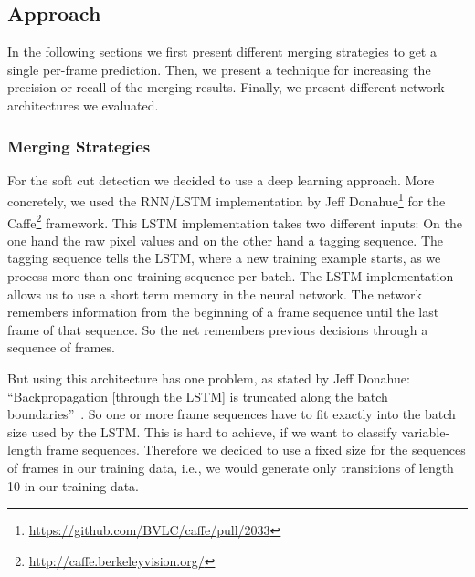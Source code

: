 \subsection{Approach}
\label{sec:soft_cut_approach}

In the following sections we first present different merging strategies to get a single per-frame prediction.
Then, we present a technique for increasing the precision or recall of the merging results.
Finally, we present different network architectures we evaluated.

\subsubsection{Merging Strategies}
For the soft cut detection we decided to use a deep learning approach.
More concretely, we used the RNN/LSTM implementation by Jeff Donahue\footnote{\url{https://github.com/BVLC/caffe/pull/2033}} for the Caffe\footnote{\url{http://caffe.berkeleyvision.org/}} framework.
This LSTM implementation takes two different inputs: On the one hand the raw pixel values and on the other hand a tagging sequence.
The tagging sequence tells the LSTM, where a new training example starts, as we process more than one training sequence per batch.
The LSTM implementation allows us to use a short term memory in the neural network.
The network remembers information from the beginning of a frame sequence until the last frame of that sequence.
So the net remembers previous decisions through a sequence of frames.

But using this architecture has one problem, as stated by Jeff Donahue: ``Backpropagation [through the LSTM] is truncated along the batch boundaries''~\cite{SequencesInCaffe}.
So one or more frame sequences have to fit exactly into the batch size used by the LSTM.
This is hard to achieve, if we want to classify variable-length frame sequences.
Therefore we decided to use a fixed size for the sequences of frames in our training data, i.e., we would generate only transitions of length 10 in our training data.

